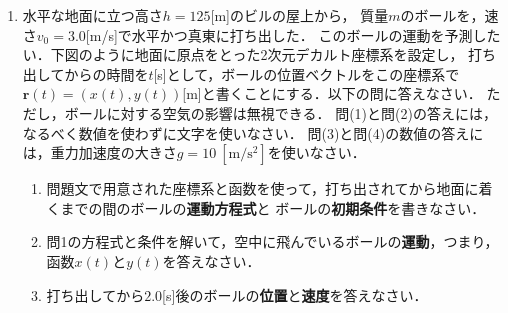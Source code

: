 \documentclass[a4paper,11pt]{ltjsarticle}
\begin{document}
\pagestyle{fancy}
\cfoot{\thepage}

\begin{enumerate}
    \item 水平な地面に立つ高さ$h=125$[m]のビルの屋上から，
    質量$m$のボールを，速さ$v_0=3.0$[m/s]で水平かつ真東に打ち出した．
    このボールの運動を予測したい．下図のように地面に原点をとった2次元デカルト座標系を設定し，
    打ち出してからの時間を$t$[s]として，ボールの位置ベクトルをこの座標系で
    $\bm{r}(t)=(x(t),y(t))$[m]と書くことにする．以下の問に答えなさい．
    ただし，ボールに対する空気の影響は無視できる．
    問(1)と問(2)の答えには，なるべく数値を使わずに文字を使いなさい．
    問(3)と問(4)の数値の答えには，重力加速度の大きさ$g=10\ [\mathrm{m/s^2}]$を使いなさい．

    \begin{center}
    \end{center}
    
    \begin{enumerate}[label=(\arabic*),start=1]
        \item 問題文で用意された座標系と函数を使って，打ち出されてから地面に着くまでの間のボールの\textbf{運動方程式}と
        ボールの\textbf{初期条件}を書きなさい．

        \clearpage

        \item 問1の方程式と条件を解いて，空中に飛んでいるボールの\textbf{運動}，つまり，函数$x(t)$と$y(t)$を答えなさい．
        
        \clearpage

        \item 打ち出してから$2.0$[s]後のボールの\textbf{位置}と\textbf{速度}を答えなさい．

        \clearpage


\end{enumerate}
\end{enumerate}
\end{document}
